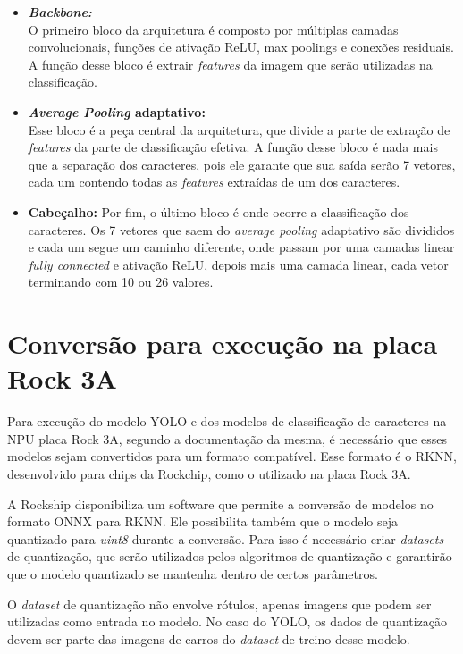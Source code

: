 \begin{itemize}
    \item \textbf{\textit{Backbone:}} \\
    O primeiro bloco da arquitetura é composto por múltiplas camadas convolucionais, funções de ativação ReLU, max poolings e conexões residuais. A função desse bloco é extrair \textit{features} da imagem que serão utilizadas na classificação.
    \item \textbf{\textit{Average Pooling} adaptativo:} \\
    Esse bloco é a peça central da arquitetura, que divide a parte de extração de \textit{features} da parte de classificação efetiva. A função desse bloco é nada mais que a separação dos caracteres, pois ele garante que sua saída serão 7 vetores, cada um contendo todas as \textit{features} extraídas de um dos caracteres.
    \item \textbf{Cabeçalho:}
    Por fim, o último bloco é onde ocorre a classificação dos caracteres. Os 7 vetores que saem do \textit{average pooling} adaptativo são divididos e cada um segue um caminho diferente, onde passam por uma camadas linear \textit{fully connected} e ativação ReLU, depois mais uma camada linear, cada vetor terminando com 10 ou 26 valores.
\end{itemize}

\section{Conversão para execução na placa Rock 3A}

Para execução do modelo YOLO e dos modelos de classificação de caracteres na NPU placa Rock 3A, segundo a documentação da mesma, é necessário que esses modelos sejam convertidos para um formato compatível. Esse formato é o RKNN, desenvolvido para chips da Rockchip, como o utilizado na placa Rock 3A.

A Rockship disponibiliza um software que permite a conversão de modelos no formato ONNX para RKNN. Ele possibilita também que o modelo seja quantizado para \textit{uint8} durante a conversão. Para isso é necessário criar \textit{datasets} de quantização, que serão utilizados pelos algoritmos de quantização e garantirão que o modelo quantizado se mantenha dentro de certos parâmetros.

O \textit{dataset} de quantização não envolve rótulos, apenas imagens que podem ser utilizadas como entrada no modelo. No caso do YOLO, os dados de quantização devem ser parte das imagens de carros do \textit{dataset} de treino desse modelo.

